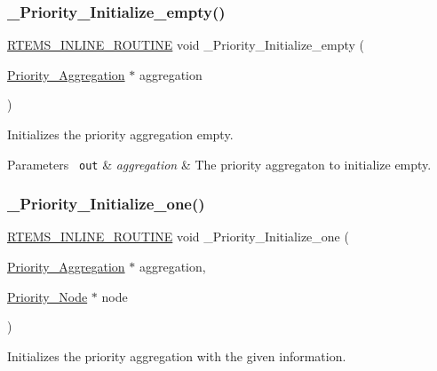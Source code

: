 \subsubsection{\texorpdfstring{\_Priority\_Initialize\_empty()}{\_Priority\_Initialize\_empty()}}
{\footnotesize\ttfamily \mbox{\hyperlink{group__RTEMSScoreBaseDefs_gac216239df231d5dbd15e3520b0b9313f}{R\+T\+E\+M\+S\+\_\+\+I\+N\+L\+I\+N\+E\+\_\+\+R\+O\+U\+T\+I\+NE}} void \+\_\+\+Priority\+\_\+\+Initialize\+\_\+empty (\begin{DoxyParamCaption}\item[{\mbox{\hyperlink{structPriority__Aggregation}{Priority\+\_\+\+Aggregation}} $\ast$}]{aggregation }\end{DoxyParamCaption})}



Initializes the priority aggregation empty. 


\begin{DoxyParams}[1]{Parameters}
\mbox{\texttt{ out}}  & {\em aggregation} & The priority aggregaton to initialize empty. \\
\hline
\end{DoxyParams}
\mbox{\label{group__RTEMSScorePriority_gac0c058cfd317fde243a7645b7a64b41c}} 
\subsubsection{\texorpdfstring{\_Priority\_Initialize\_one()}{\_Priority\_Initialize\_one()}}
{\footnotesize\ttfamily \mbox{\hyperlink{group__RTEMSScoreBaseDefs_gac216239df231d5dbd15e3520b0b9313f}{R\+T\+E\+M\+S\+\_\+\+I\+N\+L\+I\+N\+E\+\_\+\+R\+O\+U\+T\+I\+NE}} void \+\_\+\+Priority\+\_\+\+Initialize\+\_\+one (\begin{DoxyParamCaption}\item[{\mbox{\hyperlink{structPriority__Aggregation}{Priority\+\_\+\+Aggregation}} $\ast$}]{aggregation,  }\item[{\mbox{\hyperlink{structPriority__Node}{Priority\+\_\+\+Node}} $\ast$}]{node }\end{DoxyParamCaption})}



Initializes the priority aggregation with the given information. 


